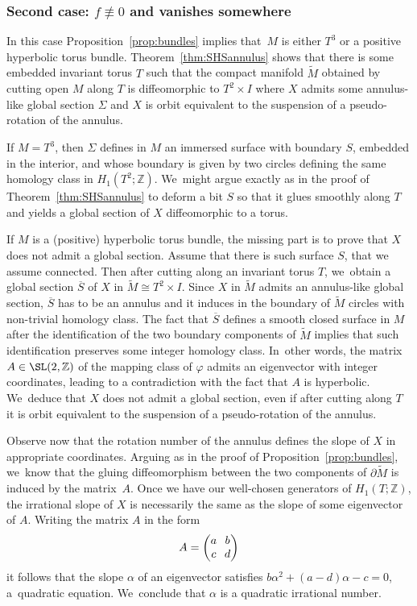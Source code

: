 \subsubsection*{Second case: $f\not \equiv 0$ and vanishes somewhere}
In this case Proposition~\ref{prop:bundles} implies that~$M$ is either $T^3$ or a positive hyperbolic torus bundle. Theorem~\ref{thm:SHSannulus} shows that there is some embedded invariant torus $T$ such that the compact manifold $\widetilde M$ obtained by cutting open $M$ along $T$ is diffeomorphic to $T^2\times I$ where $X$ admits some annulus-like global section $\Sigma$ and $X$ is orbit equivalent to the suspension of a pseudo-rotation of the annulus.

If $M=T^3$, then $\Sigma$ defines in $M$ an immersed surface with boundary $S$, embedded in the interior, and whose boundary is given by two circles defining the same homology class in $H_1(T^2;\mathbb{Z})$. We~might argue exactly as in the proof of Theorem~\ref{thm:SHSannulus} to deform a bit $S$ so that it glues smoothly along $T$ and yields a global section of $X$ diffeomorphic to a torus.

If $M$ is a (positive) hyperbolic torus bundle, the missing part is to prove that $X$ does not admit a global section. Assume that there is such surface $S$, that we assume connected. Then after cutting along an invariant torus $T$, we~obtain a global section $\overline S$ of $X$ in $\widetilde M \cong T^2\times I$. Since $X$ in $\widetilde{M}$ admits an annulus-like global section, $\overline{S}$ has to be an annulus and it induces in the boundary of $\widetilde M$ circles with non-trivial homology class.
The fact that $\overline S$ defines a smooth closed surface in $M$ after the identification of the two boundary components of $\widetilde M$ implies that such identification preserves some integer homology class. In~other words, the matrix $A\in \SL(2,\mathbb{Z})$ of the mapping class of $\varphi$ admits an eigenvector with integer coordinates, leading to a contradiction with the fact that $A$ is hyperbolic. We~deduce that $X$ does not admit a global section, even if after cutting along $T$ it is orbit equivalent to the suspension of a pseudo-rotation of the annulus.

Observe now that the rotation number of the annulus defines the slope of $X$ in appropriate coordinates. Arguing as in the proof of Proposition~\ref{prop:bundles}, we~know that the gluing diffeomorphism between the two components of $\partial \widetilde M$ is induced by the matrix~$A$. Once we have our well-chosen generators of $H_1(T;\mathbb{Z})$, the irrational slope of $X$ is necessarily the same as the slope of some eigenvector of $A$. Writing the matrix $A$ in the form
\begin{equation*}\arraycolsep3.5pt
A=\begin{pmatrix}
a & b \\
c & d
\end{pmatrix}
\end{equation*}
it follows that the slope $\alpha$ of an eigenvector satisfies $b\alpha^2+(a-d)\alpha-c=0$, a~quadratic equation. We~conclude that $\alpha$ is a quadratic irrational number.

